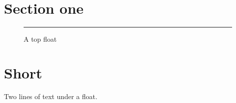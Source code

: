 \documentclass[10pt,a4paper]{article}
\begin{document}
\section{Section one}\lipsum[1-7]
\clearpage
\begin{figure}[t]\centering\rule{9cm}{4cm}\caption{A top float}\end{figure}
\section{Short}Two lines of text under a float.
\end{document}
